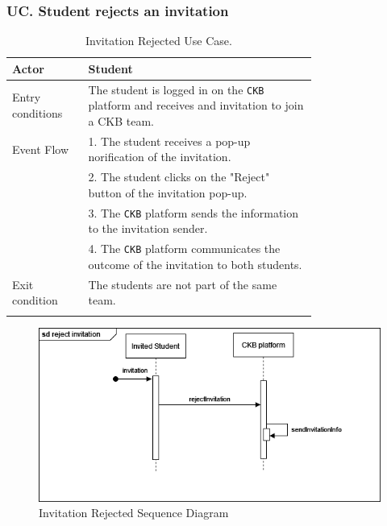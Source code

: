 \subsubsection*{UC\cuc . Student rejects an invitation}
\begin{center}
    \begin{longtable}{lp{0.75\linewidth}}
        \hline
        Actor            & Student                                                                                                                                                                               \\
        \hline
        Entry conditions & The student is logged in on the \verb|CKB| platform and receives and invitation to join a CKB team.                                                                                                               \\
        \hline
        Event Flow       
        & 1. The student receives a pop-up norification of the invitation.\\
        & 2. The student clicks on the "Reject" button of the invitation pop-up.\\
        & 3. The \verb|CKB| platform sends the information to the invitation sender.\\
        & 4. The \verb|CKB| platform communicates the outcome of the invitation to both students.\\
        \hline
        Exit condition   & The students are not part of the same team.   \\                                                                                                                                                                           
        \hline
        \caption{Invitation Rejected Use Case.}
        \label{tab: invitation_rejected_use_case}
    \end{longtable}

    \begin{figure} [H]
        \begin{center}
            \includegraphics[width=0.9\linewidth]{Images/SequenceDiagrams/SD_7.png}
            \caption{Invitation Rejected Sequence Diagram}
            \label{fig: invitation_rejected_seq_diag}
        \end{center}
    \end{figure}
\end{center}


